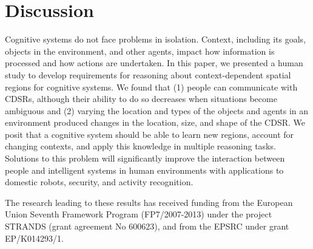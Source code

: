 \documentclass[11pt,letterpaper]{article}
\begin{document}



\section{Discussion}
Cognitive systems do not face problems in isolation.  Context, including its goals, objects in the environment, and other agents, impact how information is processed and how actions are undertaken.  In this paper, we presented a human study to develop requirements for reasoning about context-dependent spatial regions for cognitive systems.  We found that (1) people can communicate with CDSRs, although their ability to do so decreases when situations become ambiguous and (2) varying the location and types of the objects and agents in an environment produced changes in the location, size, and shape of the CDSR.  We posit that a cognitive system should be able to learn new regions, account for changing contexts, and apply this knowledge in multiple reasoning tasks. Solutions to this problem will significantly improve the interaction between people and intelligent systems in human environments with applications to domestic robots, security, and activity recognition.

\begin{acknowledgements} 
\noindent
The research leading to these results has received funding from the European Union Seventh Framework Program (FP7/2007-2013) under the project STRANDS (grant agreement No 600623), and from the EPSRC under grant EP/K014293/1.
\end{acknowledgements} 




\vspace{-0.25in}

{\parindent -10pt\leftskip 10pt\noindent
\footnotesize



}

\end{document}
